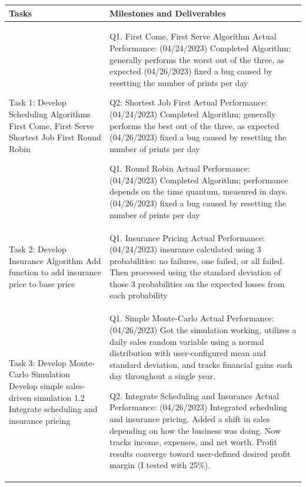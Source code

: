 \documentclass[11pt]{article}
\begin{document}
\begin{center}
    \begin{tabular}{| p{2.25in} | p{4.25in} |}
        \hline
        Tasks & Milestones and Deliverables \\
        \hline
        Task 1: Develop Scheduling Algorithms \newline
        1.1 First Come, First Serve \newline
        1.2 Shortest Job First \newline
        1.3 Round Robin &

        Q1. First Come, First Serve Algorithm \newline
        Actual Performance: (04/24/2023) Completed Algorithm; generally performs the worst out of the three, as expected (04/26/2023)
        fixed a bug caused by resetting the number of prints per day \newline

        Q2: Shortest Job First \newline
        Actual Performance: (04/24/2023) Completed Algorithm; generally performs the best out of the three, as expected (04/26/2023)
        fixed a bug caused by resetting the number of prints per day \newline

        Q1. Round Robin \newline
        Actual Performance: (04/24/2023) Completed Algorithm; performance depends on the time quantum, measured in days. (04/26/2023)
        fixed a bug caused by resetting the number of prints per day \\
        \hline
        Task 2: Develop Insurance Algorithm \newline
        1.1 Add function to add insurance price to base price &

        Q1. Insurance Pricing \newline
        Actual Performance: (04/24/2023) insurance calculated using 3 probabilities: no failures, one failed, or all failed. Then processed using
        the standard deviation of those 3 probabilities on the expected losses from each probability \\
        \hline
        Task 3: Develop Monte-Carlo Simulation \newline
        1.1 Develop simple sales-driven simulation
        1.2 Integrate scheduling and insurance pricing &

        Q1. Simple Monte-Carlo
        Actual Performance: (04/26/2023) Got the simulation working, utilizes a daily sales random variable using a normal distribution with user-configured
        mean and standard deviation, and tracks financial gains each day throughout a single year.

        Q2. Integrate Scheduling and Insurance
        Actual Performance: (04/26/2023) Integrated scheduling and insurance pricing. Added a shift in sales depending on how the business was doing. Now tracks
        income, expenses, and net worth. Profit results converge toward user-defined desired profit margin (I tested with 25\%). \\
        \hline
    \end{tabular}
\end{center}
\end{document}
